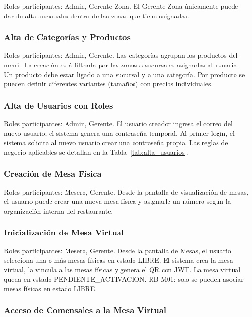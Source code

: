 Roles participantes: Admin, Gerente Zona. El Gerente Zona únicamente puede dar
de alta sucursales dentro de las zonas que tiene asignadas.

\subsubsection{Alta de Categorías y Productos}

Roles participantes: Admin, Gerente. Las categorías agrupan los productos del
menú. La creación está filtrada por las zonas o sucursales asignadas al usuario.
Un producto debe estar ligado a una sucursal y a una categoría. Por producto se
pueden definir diferentes variantes (tamaños) con precios individuales.

\subsubsection{Alta de Usuarios con Roles}

Roles participantes: Admin, Gerente. El usuario creador ingresa el correo del
nuevo usuario; el sistema genera una contraseña temporal. Al primer login, el
sistema solicita al nuevo usuario crear una contraseña propia. Las reglas de
negocio aplicables se detallan en la Tabla~\ref{tab:alta_usuarios}.

\subsubsection{Creación de Mesa Física}

Roles participantes: Mesero, Gerente. Desde la pantalla de visualización de
mesas, el usuario puede crear una nueva mesa física y asignarle un número según
la organización interna del restaurante.

\subsubsection{Inicialización de Mesa Virtual}

Roles participantes: Mesero, Gerente. Desde la pantalla de Mesas, el usuario
selecciona una o más mesas físicas en estado LIBRE. El sistema crea la mesa
virtual, la vincula a las mesas físicas y genera el QR con JWT. La mesa virtual
queda en estado PENDIENTE\_ACTIVACION. RB-M01: solo se pueden asociar mesas
físicas en estado LIBRE.

\subsubsection{Acceso de Comensales a la Mesa Virtual}

